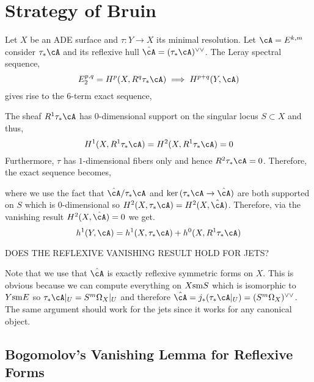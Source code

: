 \documentclass[12pt]{article}
\begin{document}
\section{Strategy of Bruin}

Let $X$ be an ADE surface and $\tau : Y \to X$ its minimal resolution. Let $\cA = E^{k,m}$ consider $\tau_* \cA$ and its reflexive hull $\hat{\cA} = (\tau_* \cA)^{\vee \vee}$. The Leray spectral sequence,
\[ E_2^{p,q} = H^p(X, R^q \tau_* \cA) \implies H^{p+q}(Y, \cA) \]
gives rise to the 6-term exact sequence,
\begin{center}
\end{center}
The sheaf $R^1 \tau_* \cA$ has 0-dimensional support on the singular locus $S \subset X$ and thus,
\[ H^1(X, R^1 \tau_* \cA) = H^2(X, R^1 \tau_* \cA) = 0 \]
Furthermore, $\tau$ has $1$-dimensional fibers only and hence $R^2 \tau_* \cA = 0$. Therefore, the exact sequence becomes,
\begin{center}
\end{center}
where we use the fact that $\hat{\cA} / \tau_* \cA$ and $\ker{(\tau_* \cA \to \hat{\cA})}$ are both supported on $S$ which is 0-dimensional so $H^2(X, \tau_* \cA) = H^2(X, \hat{\cA})$. Therefore, via the vanishing result $H^2(X, \hat{\cA}) = 0$ we get.
\[ h^1(Y, \cA) = h^1(X, \tau_* \cA) + h^0(X, R^1 \tau_* \cA) \]

{\color{red} DOES THE REFLEXIVE VANISHING RESULT HOLD FOR JETS?}

Note that we use that $\hat{\cA}$ is exactly reflexive symmetric forms on $X$. This is obvious because we can compute everything on $X \mathrm{sm} S$ which is isomorphic to $Y \mathrm{sm} E$ so $\tau_* \cA|_U = S^m \Omega_X |_U$ and therefore $\hat{\cA} = j_* (\tau_* \cA|_U) = (S^m \Omega_X)^{\vee \vee}$. The same argument should work for the jets since it works for any canonical object. 

\subsection{Bogomolov's Vanishing Lemma for Reflexive Forms}
\end{document}
